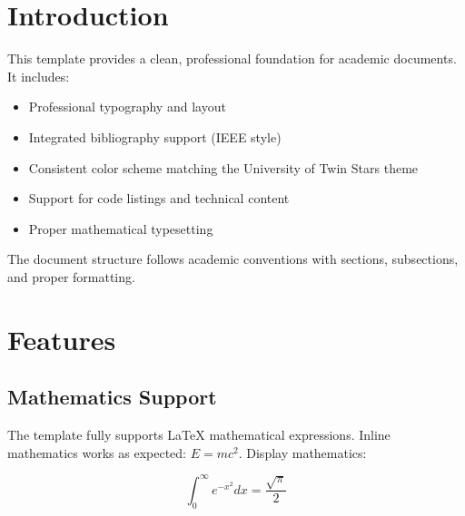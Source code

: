 \documentclass[11pt]{article}
\begin{document}
\maketitle

\begin{abstract}
    This document demonstrates the University of Twin Stars document template. It provides a professional format for academic papers, reports, and theses with consistent styling, proper typography, and integrated bibliography support.
\end{abstract}

\tableofcontents
\newpage

\section{Introduction}

This template provides a clean, professional foundation for academic documents. It includes:

\begin{itemize}
    \item Professional typography and layout
    \item Integrated bibliography support (IEEE style)
    \item Consistent color scheme matching the University of Twin Stars theme
    \item Support for code listings and technical content
    \item Proper mathematical typesetting
\end{itemize}

The document structure follows academic conventions with sections, subsections, and proper formatting.

\section{Features}

\subsection{Mathematics Support}

The template fully supports \LaTeX{} mathematical expressions. Inline mathematics works as expected: $E = mc^2$. Display mathematics:

\begin{equation}
    \int_0^\infty e^{-x^2} dx = \frac{\sqrt{\pi}}{2}
\end{equation}
\end{document}
